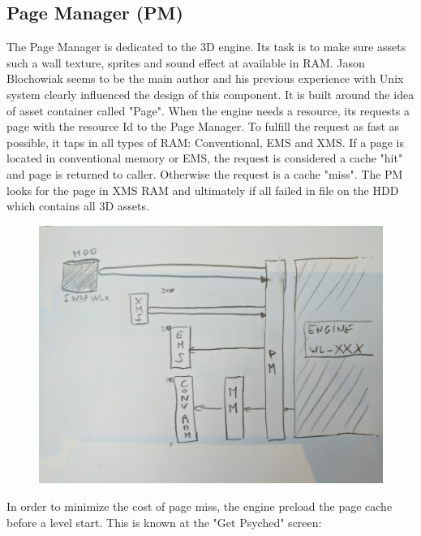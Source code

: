 \documentclass[book.tex]{subfiles}
\begin{document}
\subsection{Page Manager (PM)}
The Page Manager is dedicated to the 3D engine. Its task is to make sure assets such a wall texture, sprites and sound effect at available in RAM. Jason Blochowiak seems to be the main author and his previous experience with Unix system clearly influenced the design of this component. It is built around the idea of asset container called "Page". When the engine needs a resource, its requests a page with the resource Id to the Page Manager. To fulfill the request as fast as possible, it taps in all types of RAM: Conventional, EMS and XMS. If a page is located in conventional memory or EMS, the request is considered a cache "hit" and page is returned to caller. Otherwise the request is a cache "miss". The PM looks for the page in XMS RAM and ultimately if all failed in  file on the HDD which contains all 3D assets.\\
 \par
\begin{figure}[H]
\centering
 \includegraphics[width=\textwidth]{imgs/page_manager_architecture.png}
 \end{figure}
 \par
In order to minimize the cost of page miss, the engine preload the page cache before a level start. This is known at the "Get Psyched" screen:
 \par
\end{document}
